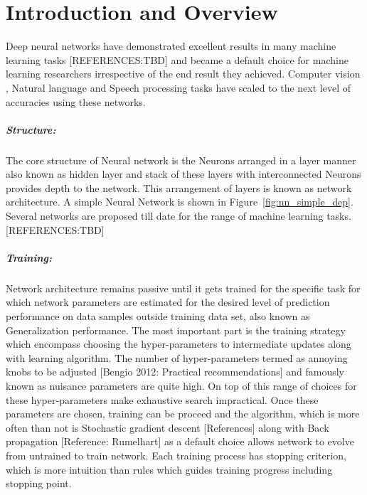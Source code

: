 
\chapter{Introduction and Overview}\label{chap:intro}
\noindent Deep neural networks have demonstrated excellent results in many machine learning tasks [REFERENCES:TBD] and became a default choice for machine learning researchers irrespective of the end result they achieved.
Computer vision , Natural language and Speech processing tasks have scaled to the next level of accuracies using these networks.
\paragraph{Structure:} The core structure of Neural network is the Neurons arranged in a layer manner also known as hidden layer and stack of these layers with interconnected Neurons provides depth to the network. This arrangement of layers is known as network architecture. A simple Neural Network is shown in Figure~\ref{fig:nn_simple_dep}.
Several networks are proposed till date for the range of machine learning tasks.[REFERENCES:TBD]
\paragraph{Training:} Network architecture remains passive until it gets trained for the specific task for which network parameters are estimated for the desired level of prediction performance on data samples outside training data set, also known as Generalization performance.
The most important part is the training strategy which encompass choosing the hyper-parameters to intermediate updates along with learning algorithm.
The number of hyper-parameters termed as annoying knobs to be adjusted [Bengio 2012: Practical recommendations] and famously known as nuisance parameters are quite high. On top of this range of choices for these hyper-parameters make exhaustive search impractical.
Once these parameters are chosen, training can be proceed and the algorithm, which is more often than not is Stochastic gradient descent [References] along with Back propagation [Reference: Rumelhart] as a default choice allows network to evolve from untrained to train network. Each training process has stopping criterion, which is more intuition than rules which guides training progress including stopping point.

